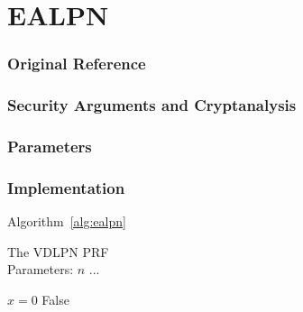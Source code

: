 \section{EALPN}
\label{sec:ealpn}


\subsubsection*{Original Reference}

\subsubsection*{Security Arguments and Cryptanalysis}


\subsubsection*{Parameters}


\subsubsection*{Implementation}

Algorithm~\ref{alg:ealpn}

\begin{algorithm}
  \caption{\label{alg:ealpn}The VDLPN PRF \\
    Parameters: $n$ ...}
  \begin{algorithmic}
    \State $x = 0$
    \Return False
  \end{algorithmic}
\end{algorithm}




